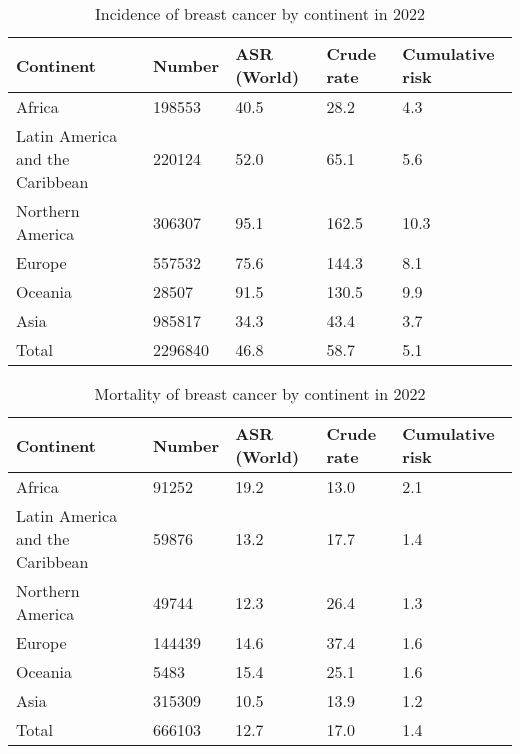 \begin{table}[ht]
    \begin{tabular}{lllll}
        \hline
        Continent                       & Number  & ASR (World) & Crude rate &
        Cumulative risk
        \\ \hline
        Africa                          & 198553  & 40.5        & 28.2       &
        4.3
        \\
        Latin America and the Caribbean & 220124  & 52.0        & 65.1       &
        5.6
        \\
        Northern America                & 306307  & 95.1        & 162.5      &
        10.3
        \\
        Europe                          & 557532  & 75.6        & 144.3      &
        8.1
        \\
        Oceania                         & 28507   & 91.5        & 130.5      &
        9.9
        \\
        Asia                            & 985817  & 34.3        & 43.4       &
        3.7
        \\
        Total                           & 2296840 & 46.8        & 58.7       &
        5.1
        \\ \hline
    \end{tabular}
    \label{tab:brca_incidence}
    \caption{Incidence of breast cancer by continent in 2022}
\end{table}

\begin{table}[ht]
    \begin{tabular}{lllll}
        \hline
        Continent                       & Number & ASR (World) & Crude rate
                                        &
        Cumulative risk
        \\ \hline
        Africa                          & 91252  & 19.2        & 13.0       &
        2.1
        \\
        Latin America and the Caribbean & 59876  & 13.2        & 17.7       &
        1.4
        \\
        Northern America                & 49744  & 12.3        & 26.4       &
        1.3
        \\
        Europe                          & 144439 & 14.6        & 37.4       &
        1.6
        \\
        Oceania                         & 5483   & 15.4        & 25.1       &
        1.6
        \\
        Asia                            & 315309 & 10.5        & 13.9       &
        1.2
        \\
        Total                           & 666103 & 12.7        & 17.0       &
        1.4
        \\ \hline
    \end{tabular}
    \label{tab:brca_mortality}
    \caption{Mortality of breast cancer by continent in 2022}
\end{table}